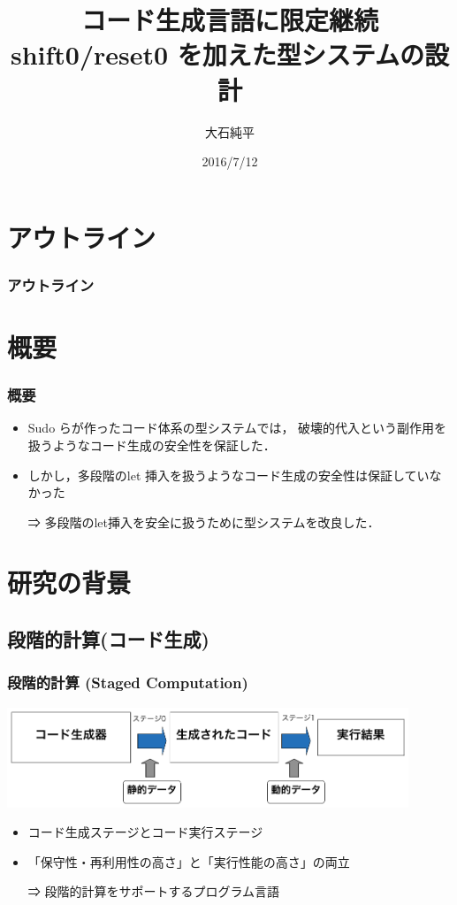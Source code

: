 \documentclass[dvipdfmx,cjk,xcolor=dvipsnames,envcountsect,notheorems,12pt]{beamer}
\title{コード生成言語に限定継続 shift0/reset0 を加えた型システムの設計}
\author{大石純平}
\institute[筑波大学 プログラム論理研究室]{筑波大学 大学院 \\ プログラム論理研究室}%
\date{2016/7/12}
\theoremstyle{definition}
\begin{document}
\frame[plain]{\titlepage}%

\section*{アウトライン}

\begin{frame}
  \frametitle{アウトライン}
  \tableofcontents[sectionstyle=show,subsectionstyle=hide]
\end{frame}

\section{概要}
\begin{frame}
  \frametitle{概要}
  \begin{itemize}
  \item Sudo らが作ったコード体系の型システムでは，
    \alert{破壊的代入}という副作用を扱うようなコード生成の安全性を保証した．
  \item しかし，\alert{多段階のlet 挿入}を扱うようなコード生成の安全性は保証していなかった
  \item[⇒] \alert{多段階のlet挿入}を安全に扱うために型システムを改良した．
  \end{itemize}
\end{frame}

\section{研究の背景}
\subsection{段階的計算(コード生成)}
\begin{frame}
  \frametitle{段階的計算 (Staged Computation)}
  \includegraphics[clip,width=12cm]{./img/prggen.png}

  \begin{itemize}
  \item コード生成ステージとコード実行ステージ
  \item 「保守性・再利用性の高さ」と「実行性能の高さ」の両立
  \item[⇒] 段階的計算をサポートするプログラム言語
  \end{itemize}
\end{frame}
\end{document}
